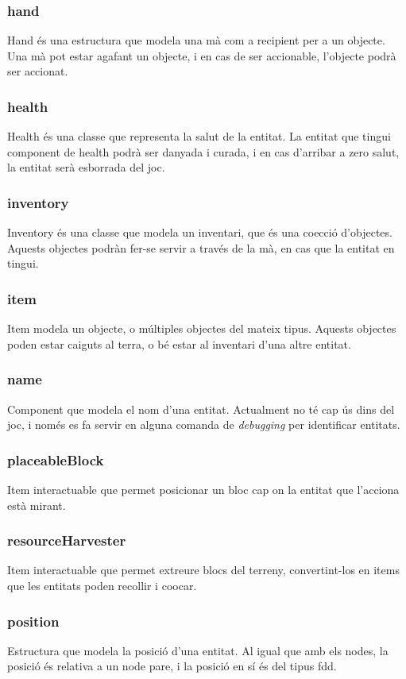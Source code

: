 \subsubsection{hand}
Hand és una estructura que modela una mà com a recipient per a un objecte. Una mà pot estar agafant un objecte, i en cas de ser accionable, l'objecte podrà ser accionat.
\subsubsection{health}
Health és una classe que representa la salut de la entitat. La entitat que tingui component de health podrà ser danyada i curada, i en cas d'arribar a zero salut, la entitat serà esborrada del joc.
\subsubsection{inventory}
Inventory és una classe que modela un inventari, que és una co\lgem ecció d'objectes. Aquests objectes podràn fer-se servir a través de la mà, en cas que la entitat en tingui.
\subsubsection{item}
Item modela un objecte, o múltiples objectes del mateix tipus. Aquests objectes poden estar caiguts al terra, o bé estar al inventari d'una altre entitat.
\subsubsection{name}
Component que modela el nom d'una entitat. Actualment no té cap ús dins del joc, i només es fa servir en alguna comanda de \textit{debugging} per identificar entitats.
\subsubsection{placeableBlock}
Item interactuable que permet posicionar un bloc cap on la entitat que l'acciona està mirant.
\subsubsection{resourceHarvester}
Item interactuable que permet extreure blocs del terreny, convertint-los en items que les entitats poden recollir i co\lgem ocar.
\subsubsection{position}
Estructura que modela la posició d'una entitat. Al igual que amb els nodes, la posició és relativa a un node pare, i la posició en sí és del tipus fdd.
